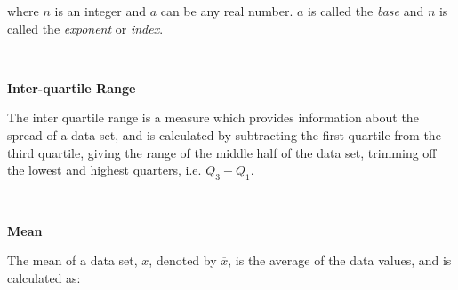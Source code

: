 \begin{description}
\begin{description}
      
      \label{m38359*id62692}where \begin{math}n\end{math} is an integer and \begin{math}a\end{math} can be any real number. \begin{math}a\end{math} is called the \textsl{base} and \begin{math}n\end{math} is called the \textsl{exponent} or \textsl{index}. \par 
      \\\end{description}
	    \vspace{.3cm}
	    \item[{\large \bfseries I}]\noindent\raggedright
	    {\bf  Inter-quartile Range }\\\begin{description}\item{\hspace{.3cm}}\hspace{.3cm}
          \label{m39400*id214019}The inter quartile range is a measure which provides information about the spread of a data set, and is calculated by subtracting the first quartile from the third quartile, giving the range of the middle half of the data set, trimming off the lowest and highest quarters, i.e. \begin{math}{Q}_{3}-{Q}_{1}\end{math}. \par 
          \\\end{description}
	    \vspace{.3cm}
	    \item[{\large \bfseries M}]\noindent\raggedright
	    {\bf  Mean }\\\begin{description}\item{\hspace{.3cm}}\hspace{.3cm}
          \label{m39400*id211228}The mean of a data set, \begin{math}x\end{math}, denoted by \begin{math}\overline{x}\end{math}, is the average of the data values, and is calculated as:\par 
          \label{m39400*uid61}\nopagebreak\noindent{}\settowidth{\mymathboxwidth}{\begin{equation}

\end{equation}}
\end{description}
\end{description}
